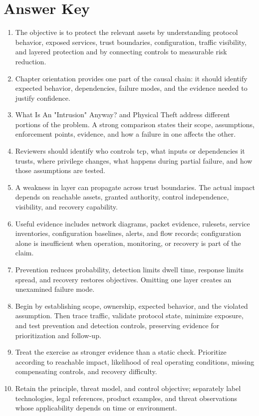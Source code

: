 \documentclass[11pt]{article}
\begin{document}
\section*{Answer Key}
\begin{enumerate}
\item The objective is to protect the relevant assets by understanding protocol behavior, exposed services, trust boundaries, configuration, traffic visibility, and layered protection and by connecting controls to measurable risk reduction.
\item Chapter orientation provides one part of the causal chain: it should identify expected behavior, dependencies, failure modes, and the evidence needed to justify confidence.
\item What Is An "Intrusion" Anyway? and Physical Theft address different portions of the problem. A strong comparison states their scope, assumptions, enforcement points, evidence, and how a failure in one affects the other.
\item Reviewers should identify who controls tcp, what inputs or dependencies it trusts, where privilege changes, what happens during partial failure, and how those assumptions are tested.
\item A weakness in layer can propagate across trust boundaries. The actual impact depends on reachable assets, granted authority, control independence, visibility, and recovery capability.
\item Useful evidence includes network diagrams, packet evidence, rulesets, service inventories, configuration baselines, alerts, and flow records; configuration alone is insufficient when operation, monitoring, or recovery is part of the claim.
\item Prevention reduces probability, detection limits dwell time, response limits spread, and recovery restores objectives. Omitting one layer creates an unexamined failure mode.
\item Begin by establishing scope, ownership, expected behavior, and the violated assumption. Then trace traffic, validate protocol state, minimize exposure, and test prevention and detection controls, preserving evidence for prioritization and follow-up.
\item Treat the exercise as stronger evidence than a static check. Prioritize according to reachable impact, likelihood of real operating conditions, missing compensating controls, and recovery difficulty.
\item Retain the principle, threat model, and control objective; separately label technologies, legal references, product examples, and threat observations whose applicability depends on time or environment.
\end{enumerate}
\end{document}
